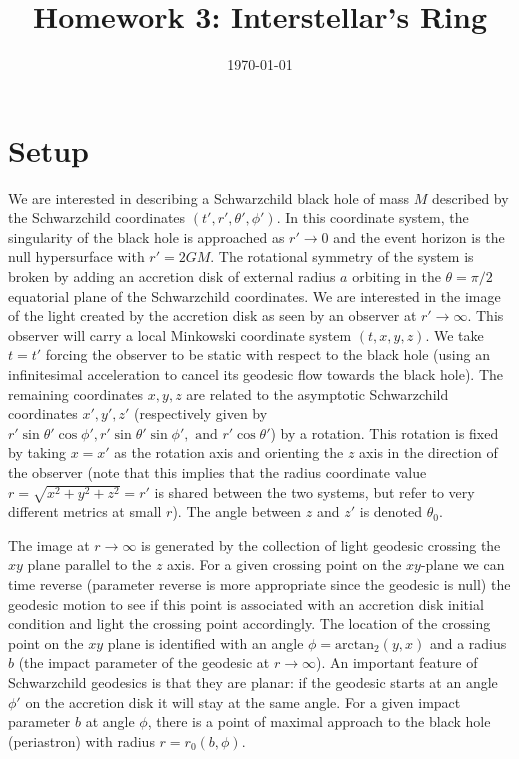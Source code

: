 \documentclass[10pt, a4paper]{article}
\title{Homework 3: Interstellar's Ring} %
\author{\PA} %
\date{\today} %
\begin{document}
\maketitlepage

\maketableofcontents


\footnotesize{

\section{Setup}
We are interested in describing a Schwarzchild black hole of mass $M$ described by the Schwarzchild coordinates $(t', r', \theta', \phi')$. In this coordinate system, the singularity of the black hole is approached as $r' \to 0$ and the event horizon is the null hypersurface with $r' = 2GM$. The rotational symmetry of the system is broken by adding an accretion disk of external radius $a$ orbiting in the $\theta = \pi/2$ equatorial plane of the Schwarzchild coordinates. We are interested in the image of the light created by the accretion disk as seen by an observer at $r'\to \infty$. This observer will carry a local Minkowski coordinate system $(t, x, y, z)$. We take $t = t'$ forcing the observer to be static with respect to the black hole (using an infinitesimal acceleration to cancel its geodesic flow towards the black hole). The remaining coordinates $x, y, z$ are related to the asymptotic Schwarzchild coordinates $x', y', z'$ (respectively given by $r' \sin \theta' \cos \phi', r' \sin \theta' \sin \phi', \text{ and } r'\cos \theta'$) by a rotation. This rotation is fixed by taking $x = x'$ as the rotation axis and orienting the $z$ axis in the direction of the observer (note that this implies that the radius coordinate value $r = \sqrt{x^2 + y^2 + z^2} = r'$ is shared between the two systems, but refer to very different metrics at small $r$). The angle between $z$ and $z'$ is denoted $\theta_0$. 

The image at $r\to \infty$ is generated by the collection of light geodesic crossing the $xy$ plane parallel to the $z$ axis. For a given crossing point on the $xy$-plane we can time reverse (parameter reverse is more appropriate since the geodesic is null) the geodesic motion to see if this point is associated with an accretion disk initial condition and light the crossing point accordingly. The location of the crossing point on the $xy$ plane is identified with an angle $\phi = \text{arctan}_2(y, x)$ and a radius $b$ (the impact parameter of the geodesic at $r\to \infty$). An important feature of Schwarzchild geodesics is that they are planar: if the geodesic starts at an angle $\phi'$ on the accretion disk it will stay at the same angle. For a given impact parameter $b$ at angle $\phi$, there is a point of maximal approach to the black hole (periastron) with radius $r = r_0(b, \phi)$.  


}
\end{document}
